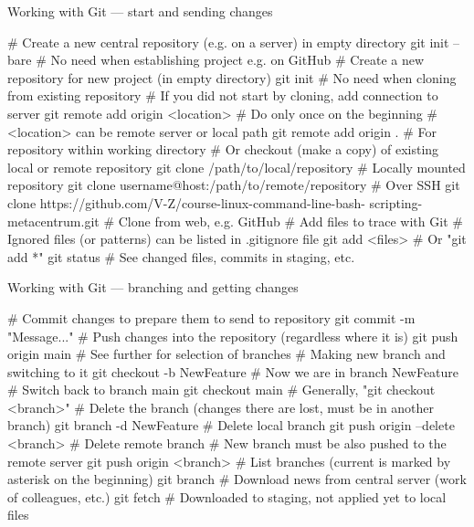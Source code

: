 \documentclass[compress, xelatex, 11pt, xcolor=svgnames, aspectratio=169, url={hyphens, lowtilde}]{beamer}
\begin{document}
\begin{frame}[fragile]{Working with Git --- start and sending changes}
	\begin{bashcode}
    # Create a new central repository (e.g. on a server) in empty directory
    git init --bare # No need when establishing project e.g. on GitHub
    # Create a new repository for new project (in empty directory)
    git init # No need when cloning from existing repository
    # If you did not start by cloning, add connection to server
    git remote add origin <location> # Do only once on the beginning
    # <location> can be remote server or local path
    git remote add origin . # For repository within working directory
    # Or checkout (make a copy) of existing local or remote repository
    git clone /path/to/local/repository # Locally mounted repository
    git clone username@host:/path/to/remote/repository # Over SSH
    git clone https://github.com/V-Z/course-linux-command-line-bash-
      scripting-metacentrum.git # Clone from web, e.g. GitHub
    # Add files to trace with Git
    # Ignored files (or patterns) can be listed in .gitignore file
    git add <files> # Or "git add *"
    git status # See changed files, commits in staging, etc.
	\end{bashcode}
\end{frame}

\begin{frame}[fragile]{Working with Git --- branching and getting changes}
	\begin{bashcode}
    # Commit changes to prepare them to send to repository
    git commit -m "Message..."
    # Push changes into the repository (regardless where it is)
    git push origin main # See further for selection of branches
    # Making new branch and switching to it
    git checkout -b NewFeature # Now we are in branch NewFeature
    # Switch back to branch main
    git checkout main # Generally, "git checkout <branch>"
    # Delete the branch (changes there are lost, must be in another branch)
    git branch -d NewFeature # Delete local branch
    git push origin --delete <branch> # Delete remote branch
    # New branch must be also pushed to the remote server
    git push origin <branch>
    # List branches (current is marked by asterisk on the beginning)
    git branch
    # Download news from central server (work of colleagues, etc.)
    git fetch # Downloaded to staging, not applied yet to local files
	\end{bashcode}
\end{frame}
\end{document}
